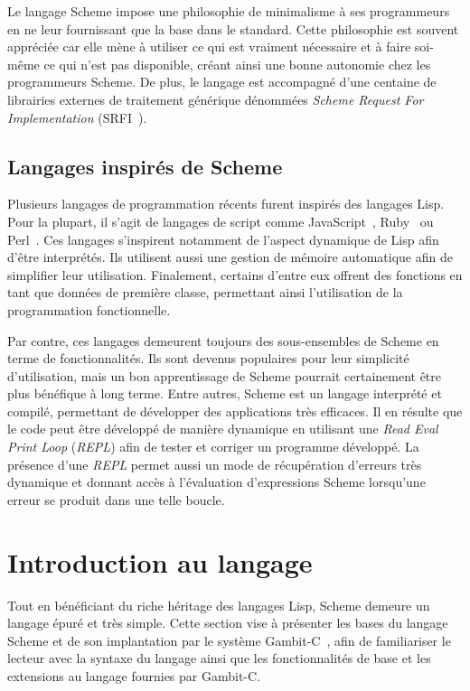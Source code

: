 \documentclass[12pt,twoside,letterpaper,francais]{book}
\begin{document}
Le langage Scheme impose une philosophie de minimalisme à ses
programmeurs en ne leur fournissant que la base dans le
standard. Cette philosophie est souvent appréciée car elle mène à
utiliser ce qui est vraiment nécessaire et à faire soi-même ce qui
n'est pas disponible, créant ainsi une bonne autonomie chez les
programmeurs Scheme. De plus, le langage est accompagné d'une centaine
de librairies externes de traitement générique dénommées
\textit{Scheme Request For Implementation} (SRFI~\cite{SRFI}).


\FloatBarrier
\subsection{Langages inspirés de Scheme}
Plusieurs langages de programmation récents furent inspirés des
langages Lisp. Pour la plupart, il s'agit de langages de script comme
JavaScript~\cite{ECMA-262}, Ruby~\cite{RUBY} ou Perl~\cite{PERL}. Ces
langages s'inspirent notamment de l'aspect dynamique de Lisp afin
d'être interprétés. Ils utilisent aussi une gestion de mémoire
automatique afin de simplifier leur utilisation. Finalement, certains
d'entre eux offrent des fonctions en tant que données de première
classe, permettant ainsi l'utilisation de la programmation
fonctionnelle.

Par contre, ces langages demeurent toujours des sous-ensembles de
Scheme en terme de fonctionnalités. Ils sont devenus populaires
pour leur simplicité d'utilisation, mais un bon apprentissage de
Scheme pourrait certainement être plus bénéfique à long
terme. Entre autres, Scheme est un langage interprété et compilé,
permettant de développer des applications très efficaces. Il en
résulte que le code peut être développé de manière dynamique en
utilisant une \textit{Read Eval Print Loop} (\textit{REPL}) afin de
tester et corriger un programme développé. La présence d'une
\textit{REPL} permet aussi un mode de récupération d'erreurs très
dynamique et donnant accès à l'évaluation d'expressions Scheme
lorsqu'une erreur se produit dans une telle boucle.


\FloatBarrier
\section{Introduction au langage}
Tout en bénéficiant du riche héritage des langages Lisp, Scheme
demeure un langage épuré et très simple. Cette section vise à
présenter les bases du langage Scheme et de son implantation par
le système Gambit-C~\cite{Gambit4}, afin de familiariser le lecteur
avec la syntaxe du langage ainsi que les fonctionnalités de base et
les extensions au langage fournies par Gambit-C.
\end{document}
